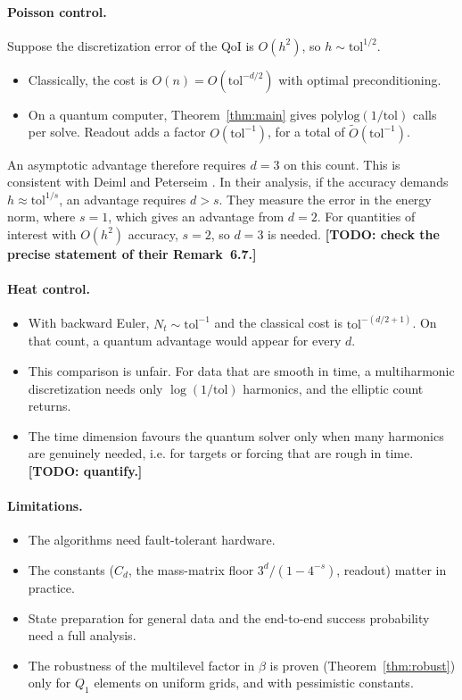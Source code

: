 \documentclass[11pt,a4paper]{article}
\newcommand{\todo}[1]{\textbf{[TODO: #1]}}
\theoremstyle{remark}
\begin{document}
\paragraph{Poisson control.} Suppose the discretization error of the QoI is
$O(h^2)$, so $h\sim\mathrm{tol}^{1/2}$.
\begin{itemize}
\item Classically, the cost is $O(n)=O(\mathrm{tol}^{-d/2})$ with optimal preconditioning.
\item On a quantum computer, Theorem~\ref{thm:main} gives $\mathrm{polylog}(1/\mathrm{tol})$
  calls per solve. Readout adds a factor $O(\mathrm{tol}^{-1})$, for a total of
  $\widetilde O(\mathrm{tol}^{-1})$.
\end{itemize}
An asymptotic advantage therefore requires $d=3$ on this count. This is
consistent with Deiml and Peterseim \cite[Remark~6.7]{DP26}. In their
analysis, if the accuracy demands $h\approx\mathrm{tol}^{1/s}$, an advantage requires
$d>s$. They measure the error in the energy norm, where $s=1$, which gives
an advantage from $d=2$. For quantities of interest with $O(h^2)$ accuracy,
$s=2$, so $d=3$ is needed. \todo{check the precise statement of their
Remark~6.7.}

\paragraph{Heat control.}
\begin{itemize}
\item With backward Euler, $N_t\sim\mathrm{tol}^{-1}$ and the classical cost is
  $\mathrm{tol}^{-(d/2+1)}$. On that count, a quantum advantage would appear for
  every $d$.
\item This comparison is unfair. For data that are smooth in time, a
  multiharmonic discretization needs only $\log(1/\mathrm{tol})$ harmonics, and the
  elliptic count returns.
\item The time dimension favours the quantum solver only when many
  harmonics are genuinely needed, i.e. for targets or forcing that are rough
  in time. \todo{quantify.}
\end{itemize}

\paragraph{Limitations.}
\begin{itemize}
\item The algorithms need fault-tolerant hardware.
\item The constants ($C_d$, the mass-matrix floor $3^d/(1-4^{-s})$, readout)
  matter in practice.
\item State preparation for general data and the end-to-end success
  probability need a full analysis.
\item The robustness of the multilevel factor in $\beta$ is proven
  (Theorem~\ref{thm:robust}) only for $Q_1$ elements on uniform grids, and
  with pessimistic constants.
\end{itemize}
\end{document}
